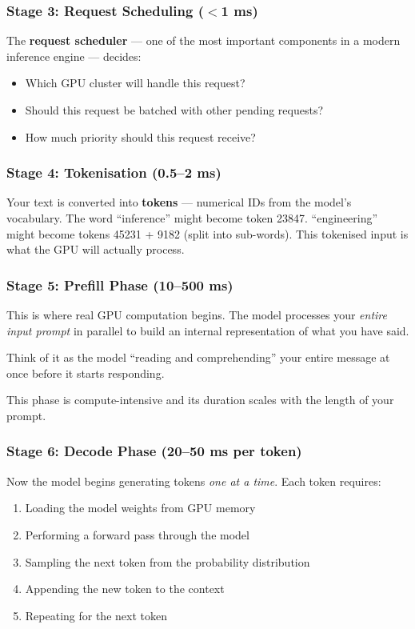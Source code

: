 \documentclass[12pt, twoside, openright]{book}
\newcommand{\term}[1]{\textbf{\color{chaptercolor}#1}}
\begin{document}
\subsubsection{Stage 3: Request Scheduling ($<$1 ms)}
The \term{request scheduler} --- one of the most important components
in a modern inference engine --- decides:
\begin{itemize}
  \item Which GPU cluster will handle this request?
  \item Should this request be batched with other pending requests?
  \item How much priority should this request receive?
\end{itemize}

\subsubsection{Stage 4: Tokenisation (0.5--2 ms)}
Your text is converted into \term{tokens} --- numerical IDs from the
model's vocabulary. The word ``inference'' might become token 23847.
``engineering'' might become tokens 45231 + 9182 (split into sub-words).
This tokenised input is what the GPU will actually process.

\subsubsection{Stage 5: Prefill Phase (10--500 ms)}
This is where real GPU computation begins.
The model processes your \textit{entire input prompt} in parallel to
build an internal representation of what you have said.

Think of it as the model ``reading and comprehending'' your entire
message at once before it starts responding.

This phase is compute-intensive and its duration scales with the
length of your prompt.

\subsubsection{Stage 6: Decode Phase (20--50 ms per token)}
Now the model begins generating tokens \textit{one at a time}.
Each token requires:
\begin{enumerate}
  \item Loading the model weights from GPU memory
  \item Performing a forward pass through the model
  \item Sampling the next token from the probability distribution
  \item Appending the new token to the context
  \item Repeating for the next token
\end{enumerate}
\end{document}
